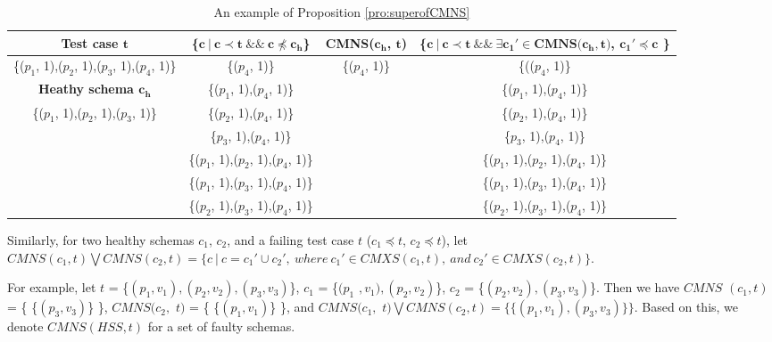 \documentclass{sig-alternate-05-2015}
\begin{document}
{%
\begin{table}[ht]
  \centering
  \setlength{\tabcolsep}{3pt}
  \caption{An example of Proposition \ref{pro:superofCMNS}}
    \begin{tabular}{|c|c|c|c|}
    \hline
  \textbf{  Test case $\textbf{t}$} & \textbf{ \{$\textbf{c}\ |\ \textbf{c} \prec \textbf{t}\ \&\&\ \textbf{c} \npreceq \textbf{c}_{\textbf{h}}$\} }& \textbf{ CMNS($\textbf{c}_{\textbf{h}}$, $\textbf{t}$)} & \textbf{\{$ \textbf{c}\ |\ \textbf{c} \prec \textbf{t} \ \&\& \ \exists \textbf{c}_{\textbf{1}}' \in \textbf{CMNS}\textbf{(}\textbf{c}_{\textbf{h}}, \textbf{t}\textbf{)}$, $  \textbf{c}_{\textbf{1}}' \preceq \textbf{c}$ \}}\\\hline
    \{($p_{1}$, 1),($p_{2}$, 1),($p_{3}$, 1),($p_{4}$, 1)\}  & \{($p_{4}$, 1)\} & \{($p_{4}$, 1)\} & \{(($p_{4}$, 1)\}\\ \cline{1-1}
      \textbf{Heathy schema $\textbf{c}_{\textbf{h}}$}  & \{($p_{1}$, 1),($p_{4}$, 1)\} &  & \{($p_{1}$, 1),($p_{4}$, 1)\} \\\cline{1-1}
     \{($p_{1}$, 1),($p_{2}$, 1),($p_{3}$, 1)\}         &\{($p_{2}$, 1),($p_{4}$, 1)\}  &  & \{($p_{2}$, 1),($p_{4}$, 1)\}  \\
                         &\{$p_{3}$, 1),($p_{4}$, 1)\}   &  & \{$p_{3}$, 1),($p_{4}$, 1)\}  \\
                         &\{($p_{1}$, 1),($p_{2}$, 1),($p_{4}$, 1)\}   &  & \{($p_{1}$, 1),($p_{2}$, 1),($p_{4}$, 1)\}  \\
                         &\{($p_{1}$, 1),($p_{3}$, 1),($p_{4}$, 1)\}  &  & \{($p_{1}$, 1),($p_{3}$, 1),($p_{4}$, 1)\}  \\
                         &\{($p_{2}$, 1),($p_{3}$, 1),($p_{4}$, 1)\}  &  & \{($p_{2}$, 1),($p_{3}$, 1),($p_{4}$, 1)\}  \\ \hline
    \end{tabular}%
  \label{examleOfCMNSPro}%
\end{table}%


Similarly, for two healthy schemas $c_{1}$, $c_{2}$, and a failing test case $t$ ($c_{1} \preceq t$, $c_{2} \preceq t$), let $CMNS(c_{1}, t) \bigvee CMNS(c_{2}, t)  = \{ c\ |\ c = c_{1}' \cup c_{2}',\ where\ c_{1}' \in CMXS(c_{1}, t),\ and\ c_{2}' \in CMXS(c_{2}, t) \}$.

For example, let $t$ = \{$(p_{1},v_{1}), (p_{2}, v_{2}), (p_{3}, v_{3})$\}, $c_{1}$ = \{$(p_{1}$ $, v_{1}), (p_{2}, v_{2})$\}, $c_{2}$ = \{$(p_{2}, v_{2}), (p_{3}, v_{3})$\}. Then we have $CMNS$ $(c_{1}, t)$ = \{ \{$(p_{3}, v_{3})$\} \}, $CMNS(c_{2},$ $ t)$ = \{ \{$(p_{1}, v_{1})$\} \}, and  $CMNS(c_{1},$ $ t) \bigvee CMNS(c_{2}, t) = \{ \{(p_{1}, v_{1}), (p_{3}, v_{3})\} \} $. Based on this, we denote $CMNS(HSS,t)$ for a set of faulty schemas.


}
\end{document}
